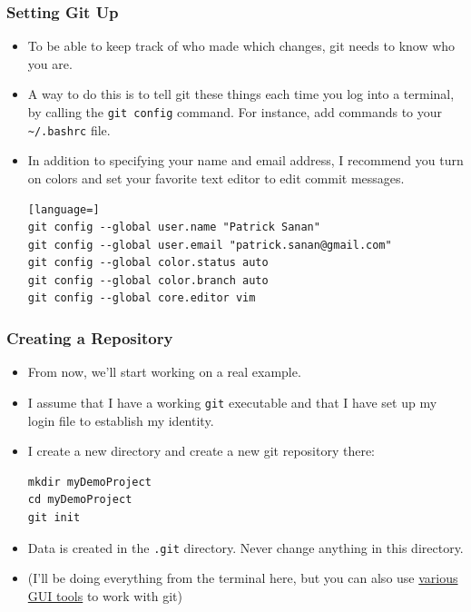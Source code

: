 \documentclass{beamer}
\begin{document}
\begin{frame}[fragile]
\frametitle{Setting Git Up}
\begin{itemize}
\item
To be able to keep track of who made which changes, git needs to know who you are.
\item
A way to do this is to tell git these things each time you log into a terminal, by calling the \lstinline{git config} command. For instance, add commands to your \lstinline{~/.bashrc} file.
\item
In addition to specifying your name and email address, I recommend you turn on colors and set your favorite text editor to edit commit messages.
\begin{lstlisting}[language=]
git config --global user.name "Patrick Sanan"
git config --global user.email "patrick.sanan@gmail.com"
git config --global color.status auto
git config --global color.branch auto
git config --global core.editor vim
\end{lstlisting}
\end{itemize}
\end{frame}

\begin{frame}[fragile]
\frametitle{Creating a Repository}
\begin{itemize}
\item From now, we'll start working on a real example.
\item I assume that I have a working \lstinline{git} executable and that I have set up my login file to establish my identity.
\item I create a new directory and create a new git repository there:
\begin{lstlisting}
mkdir myDemoProject
cd myDemoProject
git init
\end{lstlisting}
\item Data is created in the \lstinline{.git} directory. Never change anything in this directory.
\item (I'll be doing everything from the terminal here, but you can also use \href{https://git-scm.com/downloads/guis}{various GUI tools} to work with git)
\end{itemize}
\end{frame}
\end{document}
